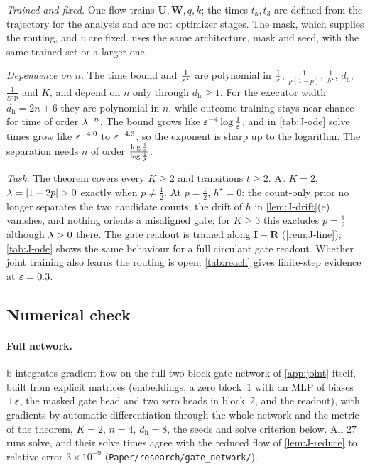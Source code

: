 \begin{remark}[Scope]
\label{rem:joint-scope}
\emph{Trained and fixed.} One flow trains $\mathbf U,\mathbf W,q,k$; the times $t_{\mathrm a},t_3$ are defined from the trajectory for the analysis and are not
optimizer stages. The mask, which supplies the routing, and $v$ are fixed.  uses the same architecture, mask and
seed, with the same trained set or a larger one.

\emph{Dependence on $n$.} The time bound and $\frac{1}{\varepsilon^\star}$ are polynomial in $\frac{1}{\varepsilon}$, $\frac{1}{p(1-p)}$, $\frac{1}{h^\star}$, $d_{\mathrm h}$, $\frac{1}{\mathrm{gap}}$ and $K$, and depend on
$n$ only through $d_{\mathrm h}\ge1$. For the executor width $d_{\mathrm h}=2n+6$ they are polynomial in $n$, while outcome training stays near chance for time of order $\lambda^{-n}$. The bound grows like $\varepsilon^{-4}\log\frac{1}{\varepsilon}$, and in \cref{tab:J-ode} solve times grow like $\varepsilon^{-4.0}$ to $\varepsilon^{-4.3}$, so the exponent is
sharp up to the logarithm. The separation needs $n$ of order $\frac{\log\frac{1}{\varepsilon}}{\log\frac{1}{\lambda}}$.

\emph{Task.} The theorem covers every $K\ge2$ and transitions $t\ge2$. At $K=2$, $\mixrate=|1-2p|>0$ exactly when $p\neq\frac{1}{2}$. At $p=\frac{1}{2}$,
$h^\star=0$: the count-only prior no longer separates the two candidate counts, the drift of $h$ in \cref{lem:J-drift}(e) vanishes, and
nothing orients a misaligned gate; for $K\ge3$ this excludes $p=\frac{1}{2}$ although $\lambda>0$ there. The gate readout is trained along
$\mathbf I-\mathbf R$ (\cref{rem:J-line}); \cref{tab:J-ode} shows the same behaviour for a full circulant gate readout. Whether joint training also learns the routing is open;
\cref{tab:reach} gives finite-step evidence at $\varepsilon=0.3$.
\end{remark}

\subsection{Numerical check}
\label{app:J-check}
\paragraph{Full network.} b integrates gradient flow on the full two-block gate network of \cref{app:joint} itself, built
from explicit matrices (embeddings, a zero block~$1$ with an MLP of biases $\pm\varepsilon$, the masked gate head and two zero heads in
block~$2$, and the readout), with gradients by automatic differentiation through the whole network and the metric of the theorem, $K=2$,
$n=4$, $d_{\mathrm h}=8$, the seeds and solve criterion below. All $27$ runs solve, and their solve times agree with the reduced flow of
\cref{lem:J-reduce} to relative error $3\times10^{-9}$ (\texttt{Paper/research/gate\_network/}).

